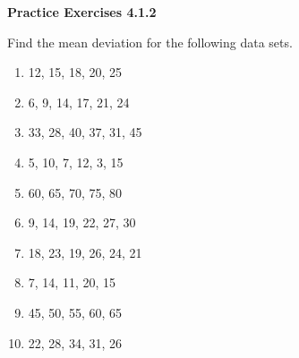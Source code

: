  \vspace{1ex}
\noindent\textbf{Practice Exercises 4.1.2}

\vspace{0.75ex}

Find the mean deviation for the following data sets.
\begin{multicols}{2}
\begin{enumerate}[noitemsep, label = \color{blue}\arabic*. ]
    \item 12, 15, 18, 20, 25
    \item 6, 9, 14, 17, 21, 24
    \item 33, 28, 40, 37, 31, 45
    \item 5, 10, 7, 12, 3, 15
    \item 60, 65, 70, 75, 80
    \item 9, 14, 19, 22, 27, 30
    \item 18, 23, 19, 26, 24, 21
    \item 7, 14, 11, 20, 15
    \item 45, 50, 55, 60, 65
    \item 22, 28, 34, 31, 26
\end{enumerate}
\end{multicols}
